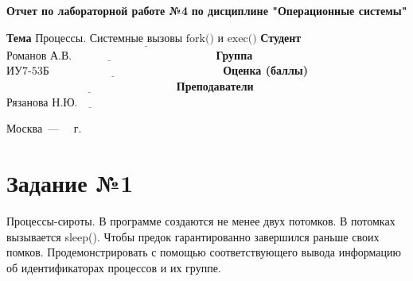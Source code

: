 \documentclass[12pt]{report}
\begin{document}
\begin{titlepage}
	
	\begin{center}
		\noindent\begin{minipage}{1.3\textwidth}\centering
			\Large\textbf{  Отчет по лабораторной работе №4}\newline
			\textbf{по дисциплине "Операционные системы"}\newline\newline
		\end{minipage}
	\end{center}
	
	\noindent\textbf{Тема} $\underline{\text{Процессы. Системные вызовы fork() и exec()}}$\newline\newline
	\noindent\textbf{Студент} $\underline{\text{Романов А.В.~~~~~~~~~~~~~~~~~~~~~~~~~~~~~~~~~~~~~~}}$\newline\newline
	\noindent\textbf{Группа} $\underline{\text{ИУ7-53Б~~~~~~~~~~~~~~~~~~~~~~~~~~~~~~~~~~~~~~~~~~~~~~}}$\newline\newline
	\noindent\textbf{Оценка (баллы)} $\underline{\text{~~~~~~~~~~~~~~~~~~~~~~~~~~~~~~~~~~~~~~~~~~~~~}}$\newline\newline
	\noindent\textbf{Преподаватели} $\underline{\text{Рязанова Н.Ю.~~~~~~~~~~~~~~~~~~~~~~~~~~}}$\newline\newline\newline
	
	\begin{center}
		\vfill
		Москва~---~\the\year
		~г.
	\end{center}
\end{titlepage}

\newpage

\section*{Задание №1}

Процессы-сироты. В программе создаются не менее двух потомков. В потомках вызывается sleep(). Чтобы предок гарантированно завершился раньше своих помков. Продемонстрировать с помощью соответствующего вывода информацию об идентификаторах процессов и их группе.
\end{document}
